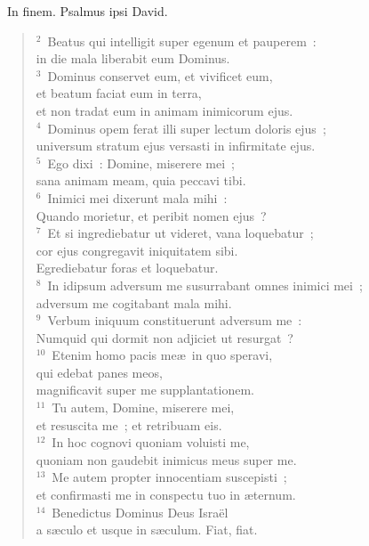 ~\lettrine[lines=10,image=true,loversize=0.05,lraise=-0.03]{I}{}n finem. Psalmus ipsi David.
\begin{flushleft}\begin{verse}\vspace{6pt}${}^{2}$~Beatus qui intelligit super egenum et pauperem~:\\ in die mala liberabit eum Dominus.\\
${}^{3}$~Dominus conservet eum, et vivificet eum,\\ et beatum faciat eum in terra,\\ et non tradat eum in animam inimicorum ejus.\\
${}^{4}$~Dominus opem ferat illi super lectum doloris ejus~;\\ universum stratum ejus versasti in infirmitate ejus.\\
${}^{5}$~Ego dixi~: Domine, miserere mei~;\\ sana animam meam, quia peccavi tibi.\\
${}^{6}$~Inimici mei dixerunt mala mihi~:\\ Quando morietur, et peribit nomen ejus~?\\
${}^{7}$~Et si ingrediebatur ut videret, vana loquebatur~;\\ cor ejus congregavit iniquitatem sibi.\\ Egrediebatur foras et loquebatur.\\
${}^{8}$~In idipsum adversum me susurrabant omnes inimici mei~;\\ adversum me cogitabant mala mihi.\\
${}^{9}$~Verbum iniquum constituerunt adversum me~:\\ Numquid qui dormit non adjiciet ut resurgat~?\\
${}^{10}$~Etenim homo pacis me\ae\ in quo speravi,\\ qui edebat panes meos,\\ magnificavit super me supplantationem.\\
${}^{11}$~Tu autem, Domine, miserere mei,\\ et resuscita me~; et retribuam eis.\\
${}^{12}$~In hoc cognovi quoniam voluisti me,\\ quoniam non gaudebit inimicus meus super me.\\
${}^{13}$~Me autem propter innocentiam suscepisti~;\\ et confirmasti me in conspectu tuo in \ae ternum.\\
${}^{14}$~Benedictus Dominus Deus Isra\"el\\ a s\ae culo et usque in s\ae culum. Fiat, fiat.\end{verse}\end{flushleft}


